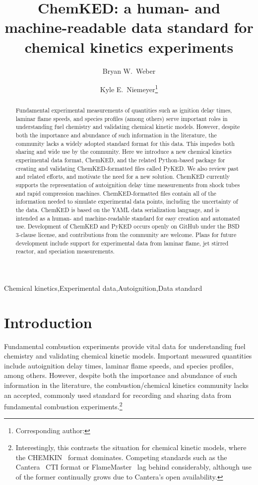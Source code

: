 \documentclass[12pt]{ijck}
\title{ ChemKED: a human- and machine-readable data standard for chemical kinetics experiments }
\author[1]{Bryan W.~Weber}
\author[2]{Kyle E.~Niemeyer\thanks{Corresponding author: \email{kyle.niemeyer@oregonstate.edu}}}
\affil[1]{Department of Mechanical Engineering, University of Connecticut, Storrs, CT, USA}
\affil[2]{School of Mechanical, Industrial, and Manufacturing Engineering, Oregon State University, Corvallis, OR, USA}
\begin{document}
\maketitle

\begin{keyword}
    Chemical kinetics\sep Experimental data\sep Autoignition\sep Data standard \\
\end{keyword}

\begin{abstract} %
Fundamental experimental measurements of quantities such as ignition delay times,
laminar flame speeds, and species profiles (among others) serve important roles in understanding
fuel chemistry and validating chemical kinetic models. However, despite both the
importance and abundance of such information in the literature, the community lacks
a widely adopted standard format for this data. This impedes both sharing and wide
use by the community. Here we introduce a new chemical kinetics
experimental data format, ChemKED, and the related Python-based package for creating
and validating ChemKED-formatted files called PyKED. We also review past and
related efforts, and motivate the need for a new solution. ChemKED currently supports
the representation of autoignition delay time measurements from shock tubes and rapid
compression machines.
ChemKED-formatted files contain all of the information needed to simulate experimental
data points, including the uncertainty of the data. ChemKED is based on the YAML data
serialization language, and is intended as a human- and machine-readable standard for
easy creation and automated use.
Development of ChemKED and PyKED occurs openly on GitHub under the
BSD 3-clause license, and contributions from the community are welcome. Plans for
future development include support for experimental data from laminar flame,
jet stirred reactor, and speciation measurements.
\end{abstract}


\section{Introduction}
%
Fundamental combustion experiments provide vital data for understanding fuel
chemistry and validating chemical kinetic models. Important measured quantities
include autoignition delay times, laminar flame speeds, and species profiles,
among others. However, despite both the importance and abundance of such
information in the literature, the combustion\slash chemical kinetics community
lacks an accepted, commonly used standard for recording and sharing data from
fundamental combustion experiments.\footnote{Interestingly, this contrasts the
situation for chemical kinetic models, where the CHEMKIN~\autocite{Kee:1996ck}
format dominates. Competing standards such as the
Cantera~\autocite{Cantera:2.3.0} CTI format or
FlameMaster~\autocite{FlameMaster:ref} lag behind considerably,
although use of the former continually grows due to Cantera's open availability.
}
\end{document}
